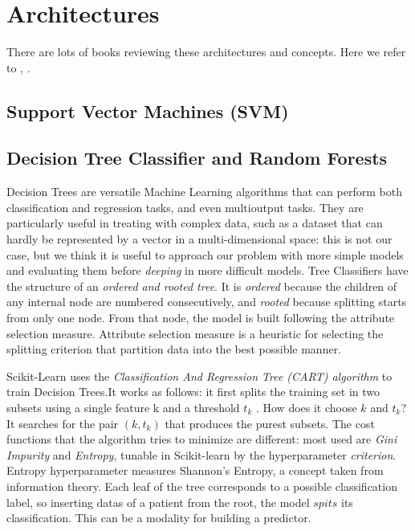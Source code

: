 \documentclass[%
 reprint,
 amsmath,amssymb,
 aps,
]{revtex4-1}
\begin{document}
\section{\label{sec:level1}Architectures}
There are lots of books reviewing these architectures and concepts. Here we refer to \cite{geron2017hands} , \cite{bishop2006pattern}
\cite{hertz1991introduction}.

\subsection{\label{sec:level2}Support Vector Machines (SVM)}

\subsection{\label{sec:level2}Decision Tree Classifier and Random Forests}

Decision Trees are versatile Machine Learning algorithms that can perform both classification and regression tasks, and even multioutput tasks. They are particularly useful in treating with complex data, such as a dataset that can hardly be represented by a vector in a multi-dimensional space: this is not our case, but we think it is useful to approach our problem with more simple models and evaluating them before \textit{deeping} in more difficult models.
Tree Classifiers have the structure of an \textit{ordered and rooted tree}. It is \textit{ordered} because the children of any internal node are numbered consecutively, and \textit{rooted} because splitting starts from only one node.
From that node, the model is built following the attribute selection measure.
Attribute selection measure is a heuristic for selecting the splitting criterion that partition data into the best possible manner.

Scikit-Learn uses the \textit{Classification And Regression Tree (CART) algorithm} to train Decision Trees.It works as follows: it first splits the training set in two subsets using a single feature k and a threshold $t_k$ . How does it choose $k$ and $t_k$? It searches for the pair $(k, t_k)$ that produces the purest subsets. The cost functions that the algorithm tries to minimize are different: most used are \textit{Gini Impurity} and \textit{Entropy}, tunable in Scikit-learn by the hyperparameter \textit{criterion}. Entropy hyperparameter measures Shannon's Entropy, a concept taken from information theory.
Each leaf of the tree corresponds to a possible classification label, so inserting datas of a patient from the root, the model $spits$ its classification. This can be a modality for building a predictor.
\end{document}
